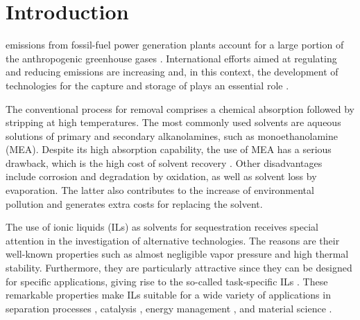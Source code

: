 \documentclass[3p,twocolumn]{elsarticle}
\begin{document}

\section{Introduction}
\label{sec:intro}

 emissions from fossil-fuel power generation plants account for a large portion of the anthropogenic greenhouse gases \cite{totalenergy}.
International efforts aimed at regulating and reducing  emissions are increasing \cite{Tong_2018} and, in this context, the development of technologies for the capture and storage of  plays an essential role \cite{Markewitz_2014}.

The conventional process for  removal comprises a chemical absorption followed by stripping at high temperatures.
The most commonly used solvents are aqueous solutions of primary and secondary alkanolamines, such as monoethanolamine (MEA).
Despite its high absorption capability, the use of MEA has a serious drawback, which is the high cost of solvent recovery \cite{Merkel_2010}.
Other disadvantages include corrosion and degradation by oxidation, as well as solvent loss by evaporation.
The latter also contributes to the increase of environmental pollution and generates extra costs for replacing the solvent.

The use of ionic liquids (ILs) as solvents for  sequestration receives special attention in the investigation of alternative technologies.
The reasons are their well-known properties such as almost negligible vapor pressure and high thermal stability.
Furthermore, they are particularly attractive since they can be designed for specific applications, giving rise to the so-called task-specific ILs \cite{Seo_2014}.
These remarkable properties make ILs suitable for a wide variety of applications in separation processes \cite{Han_2010,Werner_2010}, catalysis \cite{P_rvulescu_2007}, energy management \cite{MacFarlane_2014}, and material science \cite{Mecerreyes_2011,Tom_2015,Dupont_2010,Leones_2017,Kinik_2017}.
\end{document}
